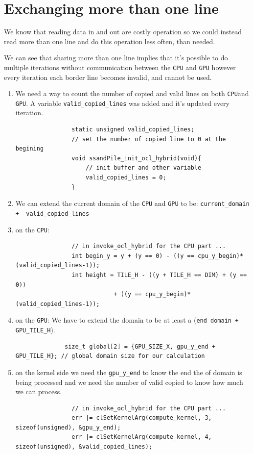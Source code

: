 \documentclass{report}
\def\CPU{\texttt{CPU}}
\def\GPU{\texttt{GPU}}
\newcommand{\code}[1]{\texttt{#1}}
\begin{document}
\section{Exchanging more than one line}
We know that reading data in and out are costly operation so we could
instead read more than one line and do this operation less often, than needed.

We can see that sharing more than one line implies that it's possible to do multiple iterations without
communication between the \CPU{} and \GPU{} however every iteration each border line becomes invalid,
and cannot be used.

\begin{enumerate}
	\item We need a way to count the number of copied and valid lines on both \CPU and \GPU.
	      A variable \code{valid_copied_lines} was added and it's updated every iteration.
	      \begin{verbatim}
                static unsigned valid_copied_lines;
                // set the number of copied line to 0 at the begining
                void ssandPile_init_ocl_hybrid(void){
                    // init buffer and other variable
                    valid_copied_lines = 0;
                }
              \end{verbatim}
	\item We can extend the current domain of the \CPU{} and \GPU{} to be:
	      \code{current_domain +- valid_copied_lines}
	\item on the \CPU{}:
	      \begin{verbatim}
                // in invoke_ocl_hybrid for the CPU part ...
                int begin_y = y + (y == 0) - ((y == cpu_y_begin)*(valid_copied_lines-1));
                int height = TILE_H - ((y + TILE_H == DIM) + (y == 0)) 
                            + ((y == cpu_y_begin)*(valid_copied_lines-1));
              \end{verbatim}
	\item on the \GPU{}:
	      We have to extend the domain to be at least a (\code{end domain + GPU_TILE_H}).
	      \begin{verbatim}
              size_t global[2] = {GPU_SIZE_X, gpu_y_end + GPU_TILE_H}; // global domain size for our calculation
              \end{verbatim}
	\item on the kernel side we need the \code{gpu_y_end} to know the end the of domain is being processed
	      and we need the number of valid copied to know how much we can process.
	      \begin{verbatim}
                // in invoke_ocl_hybrid for the CPU part ...
                err |= clSetKernelArg(compute_kernel, 3, sizeof(unsigned), &gpu_y_end);
                err |= clSetKernelArg(compute_kernel, 4, sizeof(unsigned), &valid_copied_lines);
              \end{verbatim}


\end{enumerate}
\end{document}
